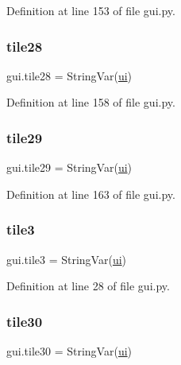 Definition at line 153 of file gui.\+py.

\mbox{\label{namespacegui_a54e9c1d0531a0815ce07491e16b116f0}} 
\subsubsection{\texorpdfstring{tile28}{tile28}}
{\footnotesize\ttfamily gui.\+tile28 = String\+Var(\mbox{\hyperlink{namespacegui_a40ab7281456eadbea2dc2038f5c24fa1}{ui}})}



Definition at line 158 of file gui.\+py.

\mbox{\label{namespacegui_ab115038ed3d4211efcc93877e730dfbc}} 
\subsubsection{\texorpdfstring{tile29}{tile29}}
{\footnotesize\ttfamily gui.\+tile29 = String\+Var(\mbox{\hyperlink{namespacegui_a40ab7281456eadbea2dc2038f5c24fa1}{ui}})}



Definition at line 163 of file gui.\+py.

\mbox{\label{namespacegui_a1a6bb0561f02127f121022bf818450b2}} 
\subsubsection{\texorpdfstring{tile3}{tile3}}
{\footnotesize\ttfamily gui.\+tile3 = String\+Var(\mbox{\hyperlink{namespacegui_a40ab7281456eadbea2dc2038f5c24fa1}{ui}})}



Definition at line 28 of file gui.\+py.

\mbox{\label{namespacegui_af7526ad516cd07f3f2ec75d8b81287a9}} 
\subsubsection{\texorpdfstring{tile30}{tile30}}
{\footnotesize\ttfamily gui.\+tile30 = String\+Var(\mbox{\hyperlink{namespacegui_a40ab7281456eadbea2dc2038f5c24fa1}{ui}})}




